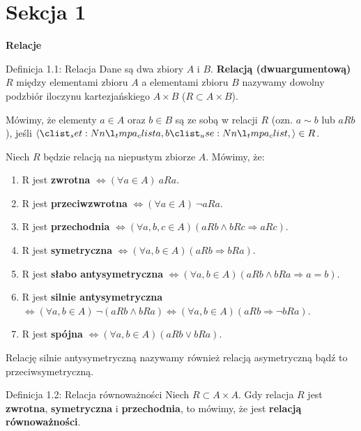 \documentclass{article}
\newcommand{\ifff}{\Leftrightarrow}
\newcommand{\imp}{\Rightarrow}
\begin{document}
                                \section*{Sekcja 1} \smallskip
                                {\Huge\bfseries Relacje} \bigskip \medskip

\begin{defr}{Definicja 1.1: Relacja}
    Dane są dwa zbiory $A$ i $B$. \textbf{Relacją (dwuargumentową)} $R$ między elementami zbioru $A$ a elementami 
    zbioru $B$ nazywamy dowolny podzbiór iloczynu kartezjańskiego $A\times B$ ($R\subset A\times B$).  
\end{defr}

Mówimy, że elementy $a\in A$ oraz $b\in B$ są ze sobą w relacji $R$ (ozn. $a\sim b$ lub $aRb$), 
jeśli $\op{a,b}\in R$. \medskip

Niech $R$ będzie relacją na niepustym zbiorze $A$. Mówimy, że:
\begin{enumerate}[label=(\arabic*), nosep]
    \item R jest \textbf{zwrotna} $\ifff (\forall a\in A)\ aRa$.
    \item R jest \textbf{przeciwzwrotna} $\ifff(\forall a\in A)\ \lnot aRa$.
    \item R jest \textbf{przechodnia} $\ifff(\forall a,b,c\in A)(aRb \land bRc \imp aRc)$.
    \item R jest \textbf{symetryczna} $\ifff(\forall a,b\in A)(aRb\imp bRa)$.
    \item R jest \textbf{słabo antysymetryczna} $\ifff(\forall a,b\in A)(aRb\land bRa\imp a=b)$.
    \item R jest \textbf{silnie antysymetryczna} $\ifff(\forall a,b\in A)\ \lnot(aRb\land bRa)\ifff(\forall a,b\in A)
    (aRb\imp\lnot bRa)$.
    \item R jest \textbf{spójna} $\ifff(\forall a,b\in A)(aRb\lor bRa)$.
\end{enumerate} \smallskip

Relację silnie antysymetryczną nazywamy również relacją asymetryczną bądź to
przeciwsymetryczną.

\begin{defr}{Definicja 1.2: Relacja równoważności}
    Niech $R\subset A\times A$. Gdy relacja $R$ jest \textbf{zwrotna}, \textbf{symetryczna} i \textbf{przechodnia}, to mówimy, że
    jest \textbf{relacją równoważności}.
\end{defr}
\end{document}
